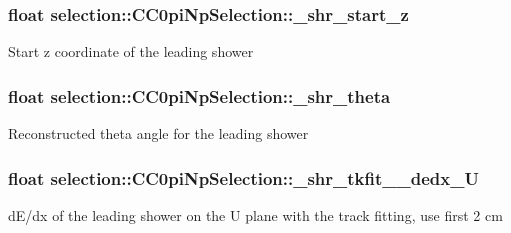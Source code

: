 \subsubsection[{\texorpdfstring{\+\_\+shr\+\_\+start\+\_\+z}{_shr_start_z}}]{\setlength{\rightskip}{0pt plus 5cm}float selection\+::\+C\+C0pi\+Np\+Selection\+::\+\_\+shr\+\_\+start\+\_\+z\hspace{0.3cm}{\ttfamily [private]}}\hypertarget{classselection_1_1CC0piNpSelection_a6e8b4637c8de2991e4d48291d3e90ddf}{}\label{classselection_1_1CC0piNpSelection_a6e8b4637c8de2991e4d48291d3e90ddf}
Start z coordinate of the leading shower 
\subsubsection[{\texorpdfstring{\+\_\+shr\+\_\+theta}{_shr_theta}}]{\setlength{\rightskip}{0pt plus 5cm}float selection\+::\+C\+C0pi\+Np\+Selection\+::\+\_\+shr\+\_\+theta\hspace{0.3cm}{\ttfamily [private]}}\hypertarget{classselection_1_1CC0piNpSelection_a624a38f7c8d33320df92e610fd0e16ee}{}\label{classselection_1_1CC0piNpSelection_a624a38f7c8d33320df92e610fd0e16ee}
Reconstructed theta angle for the leading shower 
\subsubsection[{\texorpdfstring{\+\_\+shr\+\_\+tkfit\+\_\+2cm\+\_\+dedx\+\_\+U}{_shr_tkfit_2cm_dedx_U}}]{\setlength{\rightskip}{0pt plus 5cm}float selection\+::\+C\+C0pi\+Np\+Selection\+::\+\_\+shr\+\_\+tkfit\+\_\+2cm\+\_\+dedx\+\_\+U\hspace{0.3cm}{\ttfamily [private]}}\hypertarget{classselection_1_1CC0piNpSelection_a2ae6bb1925bd4f20deb1427c2bde2674}{}\label{classselection_1_1CC0piNpSelection_a2ae6bb1925bd4f20deb1427c2bde2674}
d\+E/dx of the leading shower on the U plane with the track fitting, use first 2 cm 

